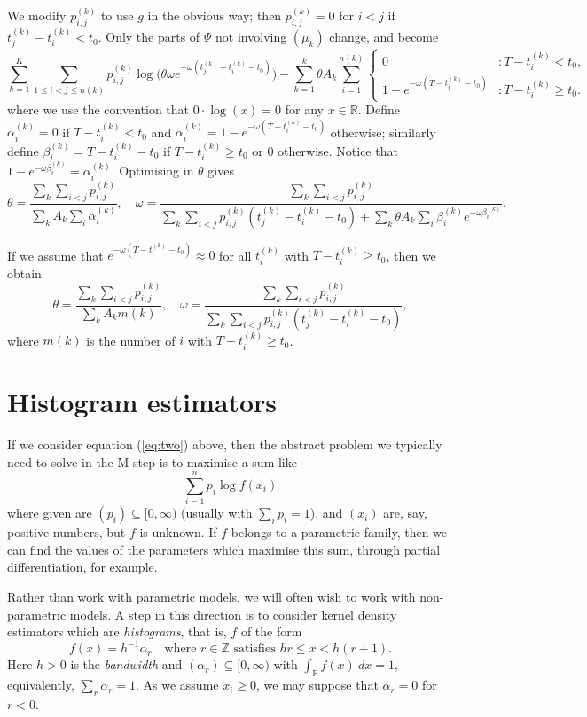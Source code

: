 \documentclass[twoside,a4paper]{article}
\theoremstyle{plain}
\theoremstyle{definition}
\begin{document}
We modify $p^{(k)}_{i,j}$ to use $g$ in the obvious way; then $p^{(k)}_{i,j} = 0$ for
$i<j$ if $t^{(k)}_j - t^{(k)}_i < t_0$.
Only the parts of $\Psi$ not involving $(\mu_k)$ change, and become
\[ \sum_{k=1}^K \sum_{1 \leq i<j\leq n(k)} p^{(k)}_{i,j}
\log\big( \theta\omega e^{-\omega(t^{(k)}_j - t^{(k)}_i - t_0)} \big)
- \sum_{k=1}^k \theta A_k \sum_{i=1}^{n(k)}
\begin{cases} 0 &: T - t^{(k)}_i < t_0, \\
1 - e^{-\omega(T - t^{(k)}_i - t_0)} &: T - t^{(k)}_i \geq t_0. \end{cases} \]
where we use the convention that $0\cdot \log(x) = 0$ for any $x\in\mathbb R$.
Define $\alpha^{(k)}_i = 0$ if $T - t^{(k)}_i < t_0$ and
$\alpha^{(k)}_i = 1 - e^{-\omega(T - t^{(k)}_i - t_0)}$ otherwise; similarly
define $\beta^{(k)}_i = T - t^{(k)}_i - t_0$ if $T - t^{(k)}_i \geq t_0$ or $0$
otherwise.  Notice that $1 - e^{-\omega \beta^{(k)}_i} = \alpha^{(k)}_i$.
Optimising in $\theta$ gives
\[ \theta = \frac{\sum_k \sum_{i<j} p^{(k)}_{i,j}}
{\sum_k A_k \sum_i \alpha^{(k)}_i},
\quad
\omega = \frac{\sum_k \sum_{i<j} p^{(k)}_{i,j}}
{\sum_k \sum_{i<j} p^{(k)}_{i,j}(t^{(k)}_j - t^{(k)}_i - t_0)
+ \sum_k \theta A_k \sum_i \beta^{(k)}_i e^{-\omega\beta^{(k)}_i}
}. \]

If we assume that $e^{-\omega(T-t^{(k)}_i-t_0)} \approx 0$ for all $t^{(k)}_i$
with $T - t^{(k)}_i \geq t_0$, then we obtain
\[ \theta = \frac{\sum_k \sum_{i<j} p^{(k)}_{i,j}}
{\sum_k A_k m(k)},
\quad
\omega = \frac{\sum_k \sum_{i<j} p^{(k)}_{i,j}}
{\sum_k \sum_{i<j} p^{(k)}_{i,j}(t^{(k)}_j - t^{(k)}_i - t_0)}, \]
where $m(k)$ is the number of $i$ with $T - t^{(k)}_i \geq t_0$.



\section{Histogram estimators}\label{sec:his_est}

If we consider equation (\ref{eq:two}) above, then the abstract problem we typically
need to solve in the M step is to maximise a sum like
\[ \sum_{i=1}^n p_i \log f(x_i) \]
where given are $(p_i) \subseteq [0,\infty)$
(usually with $\sum_i p_i=1$), and $(x_i)$ are, say,
positive numbers, but $f$ is unknown.  If $f$ belongs to a parametric family, then
we can find the values of the parameters which maximise this sum, through partial
differentiation, for example.

Rather than work with parametric models, we will often wish to work with non-parametric
models.  A step in this direction is to consider kernel density estimators which are
\emph{histograms}, that is, $f$ of the form
\[ f(x) = h^{-1}\alpha_r \quad\text{where }r\in\mathbb Z
\text{ satisfies } hr \leq x < h(r+1). \]
Here $h>0$ is the \emph{bandwidth} and $(\alpha_r) \subseteq [0,\infty)$ with
$\int_{\mathbb R} f(x) \ dx = 1$, equivalently, $\sum_r \alpha_r = 1$.
As we assume $x_i\geq 0$, we may suppose that $\alpha_r=0$ for $r<0$.
\end{document}

